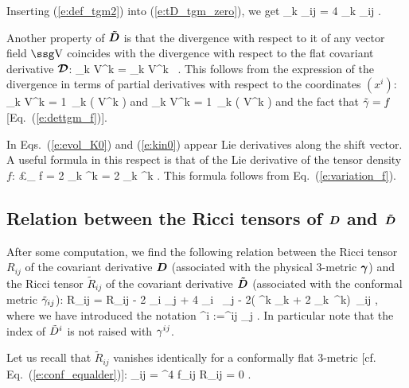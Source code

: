 Inserting (\ref{e:def_tgm2}) into (\ref{e:tD_tgm_zero}), we get
\be \label{e:td_gm}
	\tna_k \gm_{ij} = 4 \tna_k \ln\Psi \: \gm_{ij} .
\ee

Another property of $\mbox{\boldmath ${\tilde D}$}$ is that the divergence with respect
to it of any vector field $\w{V}$ coincides with the divergence with respect
to the flat covariant derivative $\mbox{\boldmath ${{\cal D}}$}$:
\be
	\tna_k V^k = \cD_k V^k \ .
\ee
This follows from the expression of the divergence 
in terms of partial derivatives with
respect to the coordinates $(x^i)$:
\be
	\tna_k V^k = {1\over \sqrt{\tgm}}\, 
		\partial_k \left( \sqrt{\tgm} V^k \right)
	\qquad \mbox{and} \qquad
	\cD_k V^k = {1\over {}}\, 
		\partial_k \left(  V^k \right)
\ee
and the fact that $\tilde\gamma = f$ [Eq.~(\ref{e:dettgm_f})].

In Eqs.~(\ref{e:evol_K0}) and (\ref{e:kin0}) appear Lie derivatives
along the shift vector. A useful formula in this respect is that
of the Lie derivative of the tensor density $f$:
\be
	\pounds_{\wg{\beta}} \ln f = 2 \tna_k \beta^k = 2 \cD_k \beta^k  .
\ee
This formula follows from Eq.~(\ref{e:variation_f}).

\subsection{Relation between the Ricci tensors of $\mbox{\boldmath ${D}$}$
and $\mbox{\boldmath ${\tilde D}$}$}

After some computation, we find the following relation between
the Ricci tensor $R_{ij}$ of the covariant derivative $\mbox{\boldmath ${D}$}$
(associated with the physical 3-metric $\mbox{\boldmath ${\gamma}$}$) and the
Ricci tensor $\tilde R_{ij}$ of the covariant derivative $\mbox{\boldmath ${\tilde D}$}$
(associated with the conformal metric $\tilde\gamma_{ij}$):
\be \label{e:R_tR}
	R_{ij} = \tilde R_{ij} - 2 \tna_i \tna_j \ln \Psi 
	+ 4 \tna_i \ln\Psi \, \tna_j\ln\Psi
	- 2\left( \tna^k \tna_k\ln\Psi
	 + 2 \tna_k\ln\Psi \, \tna^k\ln\Psi \right)\, \tgm_{ij}  , 
\ee
where we have introduced the notation 
\be \label{e:def_uptD}
	\tna^i :=\tgm^{ij} \tna_j .
\ee
In particular note that the index of $\tilde D^i$ is not raised with 
$\gamma^{ij}$. 


Let us recall that $\tilde R_{ij}$ vanishes identically for
a conformally flat 3-metric [cf. Eq.~(\ref{e:conf_equalder})]:
\be
	\gm_{ij} = \Psi^4 f_{ij} \; \Longrightarrow \; 
	\tilde R_{ij} = 0 .
\ee

